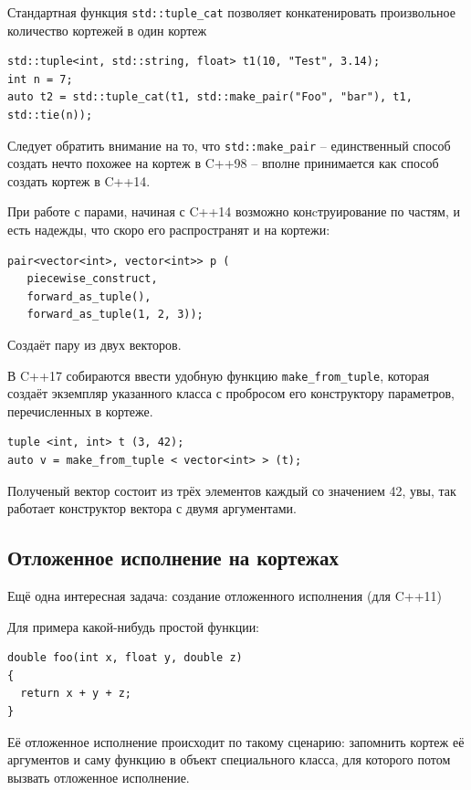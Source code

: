 \documentclass[a4paper,12pt,oneside]{book}
\begin{document}
Стандартная функция \lstinline!std::tuple_cat! позволяет конкатенировать произвольное количество кортежей в один кортеж

\begin{lstlisting}
std::tuple<int, std::string, float> t1(10, "Test", 3.14);
int n = 7;
auto t2 = std::tuple_cat(t1, std::make_pair("Foo", "bar"), t1, std::tie(n));
\end{lstlisting}

Следует обратить внимание на то, что \lstinline!std::make_pair! -- единственный способ создать нечто похожее на кортеж в C++98 -- вполне принимается как способ создать кортеж в C++14.

При работе с парами, начиная с C++14 возможно конcтруирование по частям, и есть надежды, что скоро его распространят и на кортежи:

\begin{lstlisting}
pair<vector<int>, vector<int>> p (
   piecewise_construct,
   forward_as_tuple(),
   forward_as_tuple(1, 2, 3));
\end{lstlisting}

Создаёт пару из двух векторов.

В C++17 собираются ввести удобную функцию \lstinline!make_from_tuple!, которая создаёт экземпляр указанного класса с пробросом его конструктору параметров, перечисленных в кортеже.

\begin{lstlisting}
tuple <int, int> t (3, 42);
auto v = make_from_tuple < vector<int> > (t);
\end{lstlisting}

Полученый вектор состоит из трёх элементов каждый со значением 42, увы, так работает конструктор вектора с двумя аргументами.

\subsection{Отложенное исполнение на кортежах}\label{DelayedExec}

Ещё одна интересная задача: создание отложенного исполнения (для C++11)

Для примера какой-нибудь простой функции:

\begin{lstlisting}
double foo(int x, float y, double z)
{
  return x + y + z;
}
\end{lstlisting}

Её отложенное исполнение происходит по такому сценарию: запомнить кортеж её аргументов и саму функцию в объект специального класса, для которого потом вызвать отложенное исполнение.
\end{document}
